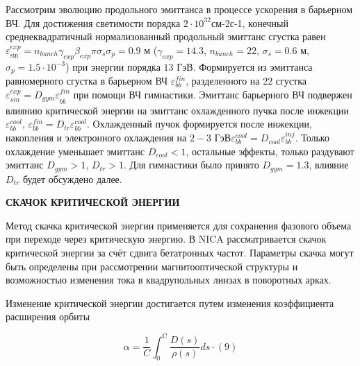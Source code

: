 \par Рассмотрим эволюцию продольного эмиттанса в процессе ускорения в барьерном ВЧ. 
Для достижения светимости порядка $2 \cdot 10^{32}$см-2с-1, конечный среднеквадратичный нормализованный продольный эмиттанс сгустка равен $\varepsilon_{\sin}^{exp}=n_{bunch}\gamma_{exp}\beta_{exp}\pi\sigma_s\sigma_p=0.9$ м ($\gamma_{exp}=14.3$, $n_{bunch}=22$, $\sigma_s=0.6$ м, $\sigma_p=1.5\cdot 10^{-3}$) при энергии порядка $13$ ГэВ. 
Формируется из эмиттанса равномерного сгустка в барьерном ВЧ $\varepsilon_{bb}^{fin}$, разделенного на $22$ сгустка $\varepsilon_{sin}^{exp}={D_{gym}\varepsilon}_{bb}^{fin}$ при помощи ВЧ гимнастики. 
Эмиттанс барьерного ВЧ подвержен влиянию критической энергии на эмиттанс охлажденного пучка после инжекции $\varepsilon_{bb}^{cool}$, $\varepsilon_{bb}^{fin}=D_{tr}\varepsilon_{bb}^{cool}$. 
Охлажденный пучок формируется после инжекции, накопления и электронного охлаждения на $2-3$ ГэВ$\varepsilon_{bb}^{cool}=D_{cool}\varepsilon_{bb}^{inj}$. 
Только охлаждение уменьшает эмиттанс $D_{cool}<1$, остальные эффекты, только раздувают эмиттанс $D_{gym}>1$, $D_{tr}>1$. 
Для гимнастики было принято $D_{gym}=1.3$, влияние $D_{tr}$ будет обсуждено далее.


	\textbf{СКАЧОК КРИТИЧЕСКОЙ ЭНЕРГИИ}
\par Метод скачка критической энергии применяется для сохранения фазового объема при переходе через критическую энергию. В NICA рассматривается скачок критической энергии за счёт сдвига бетатронных частот. Параметры скачка могут быть определены при рассмотрении магнитооптической структуры и возможностью изменения тока в квадрупольных линзах в поворотных арках. 

\par Изменение критической энергии достигается путем изменения коэффициента расширения орбиты

\begin{equation}
\alpha=\frac{1}{C} \int_0^{\mathrm{C}} \frac{D(s)}{\rho(s)} d s \cdot(9)
\label{eq:alpha_general}
\end{equation}

